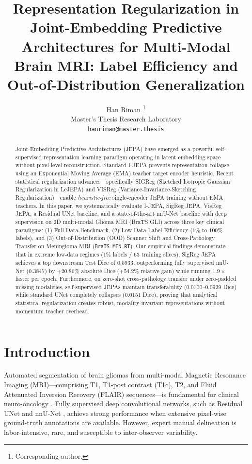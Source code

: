 \documentclass{article}
\title{Representation Regularization in Joint-Embedding Predictive Architectures for Multi-Modal Brain MRI: Label Efficiency and Out-of-Distribution Generalization}
\author{%
  Han Riman \thanks{Corresponding author.} \\
  Master's Thesis Research Laboratory \\
  \texttt{hanriman@master.thesis} \\
}
\begin{document}
\maketitle

\begin{abstract}
Joint-Embedding Predictive Architectures (JEPA) have emerged as a powerful self-supervised representation learning paradigm operating in latent embedding space without pixel-level reconstruction. Standard I-JEPA prevents representation collapse using an Exponential Moving Average (EMA) teacher target encoder heuristic. Recent statistical regularization advances—specifically SIGReg (Sketched Isotropic Gaussian Regularization in LeJEPA) and VISReg (Variance-Invariance-Sketching Regularization)—enable \emph{heuristic-free} single-encoder JEPA training without EMA teachers. In this paper, we systematically evaluate I-JEPA, SigReg JEPA, VisReg JEPA, a Residual UNet baseline, and a state-of-the-art nnU-Net baseline with deep supervision on 2D multi-modal Glioma MRI (BraTS GLI) across three key clinical paradigms: (1) Full-Data Benchmark, (2) Low-Data Label Efficiency ($1\%$ to $100\%$ labels), and (3) Out-of-Distribution (OOD) Scanner Shift and Cross-Pathology Transfer on Meningioma MRI (\texttt{BraTS-MEN-RT}). Our empirical findings demonstrate that in extreme low-data regimes ($1\%$ labels / $63$ training slices), SigReg JEPA achieves a top downstream Test Dice of $0.5933$, outperforming fully supervised nnU-Net ($0.3847$) by $+20.86\%$ absolute Dice ($+54.2\%$ relative gain) while running $1.9\times$ faster per epoch. Furthermore, on zero-shot cross-pathology transfer under zero-padded missing modalities, self-supervised JEPAs maintain transferability ($0.0700$--$0.0929$ Dice) while standard UNet completely collapses ($0.0151$ Dice), proving that analytical statistical regularization creates robust, modality-invariant representations without momentum teacher overhead.
\end{abstract}


\section{Introduction}

Automated segmentation of brain gliomas from multi-modal Magnetic Resonance Imaging (MRI)—comprising T1, T1-post contrast (T1c), T2, and Fluid Attenuated Inversion Recovery (FLAIR) sequences—is fundamental for clinical neuro-oncology \citep{brats2024}. Fully supervised deep convolutional networks, such as Residual UNet \citep{ronneberger2015u} and nnU-Net \citep{isensee2021nnunet}, achieve strong performance when extensive pixel-wise ground-truth annotations are available. However, expert manual delineation is labor-intensive, rare, and susceptible to inter-observer variability.
\end{document}

